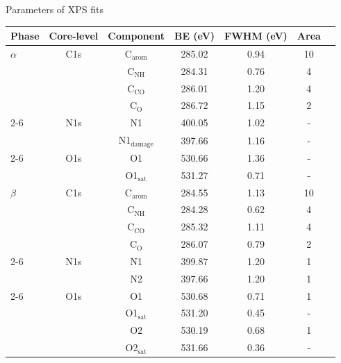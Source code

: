 \documentclass[xcolor=dvipsnames, aspectratio=169]{beamer}
\begin{document}
\begin{frame}{Parameters of XPS fits}
    \begin{table}
    \centering
    \scriptsize
        \begin{tabular}{@{}lcccccc@{}}
            \toprule
            \textbf{Phase} & \textbf{Core-level} & \textbf{Component} & \textbf{BE (eV)} & \textbf{FWHM (eV)} & \textbf{Area} \\
            \midrule
            $\alpha$ & C1s & C$_{\text{arom}}$ & 285.02 & 0.94 & 10 \\
            &  & C$_{\text{NH}}$ & 284.31 & 0.76 & 4 \\
            &  & C$_{\text{CO}}$ & 286.01 & 1.20 & 4 \\
            &  & C$_{\text{O}}$ & 286.72 & 1.15 & 2 \\
            \cmidrule{2-6}
            & N1s & N1 & 400.05 & 1.02 & -  \\
            &  & N1$_\text{damage}$ & 397.66 & 1.16 & -  \\
            \cmidrule{2-6}
             & O1s & O1 & 530.66 & 1.36 & -  \\
            &  & O1$_\text{sat}$ & 531.27 & 0.71 &  -  \\
            \midrule \midrule
            $\beta$ & C1s & C$_{\text{arom}}$ & 284.55 & 1.13 & 10 \\
            &  & C$_{\text{NH}}$ & 284.28 & 0.62 & 4 \\
            &  & C$_{\text{CO}}$ & 285.32 & 1.11 & 4 \\
            &  & C$_{\text{O}}$ & 286.07 & 0.79 & 2 \\
            \cmidrule{2-6}
            & N1s & N1 & 399.87 & 1.20 & 1 \\
            &  & N2 & 397.66 & 1.20 & 1 \\
            \cmidrule{2-6}
            & O1s & O1 & 530.68 & 0.71 & 1 \\
            &  & O1$_\text{sat}$ & 531.20 & 0.45 &  -  \\
            &  & O2 & 530.19 & 0.68 & 1 \\
            &  & O2$_\text{sat}$ & 531.66 & 0.36 &  -  \\
            \bottomrule
        \end{tabular}
    \end{table}

\end{frame}
\end{document}

